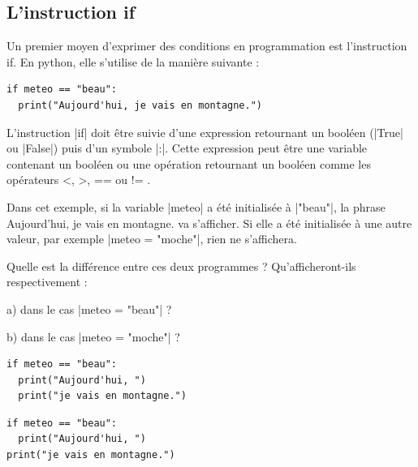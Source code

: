 \documentclass[11pt, a4paper]{book}
\begin{document}
\subsection{L'instruction \textsf{if}}
Un premier moyen d'exprimer des conditions en programmation est l'instruction \textsf{if}. En python, elle s'utilise de la manière suivante : 

\begin{lstlisting}
if meteo == "beau":
  print("Aujourd'hui, je vais en montagne.")
\end{lstlisting}

\begin{defi}
L'instruction |if| doit être suivie d'une expression retournant un booléen (|True| ou |False|) puis d'un symbole |:|.  Cette expression peut être une variable contenant un booléen ou une opération retournant un booléen comme les opérateurs <, >, == ou != .
\end{defi}

Dans cet exemple, si la variable |meteo| a été initialisée à |"beau"|, la phrase \textsf{Aujourd'hui, je vais en montagne.} va s'afficher. Si elle a été initialisée à une autre valeur, par exemple |meteo = "moche"|, rien ne s'affichera.


\begin{exercice}
Quelle est la différence entre ces deux programmes ? Qu'afficheront-ils respectivement :
\item[a)] dans le cas |meteo = "beau"| ?
\item[b)] dans le cas |meteo = "moche"| ?

\begin{lstlisting}
if meteo == "beau":
  print("Aujourd'hui, ")
  print("je vais en montagne.")
\end{lstlisting}


\begin{lstlisting}
if meteo == "beau":
  print("Aujourd'hui, ")
print("je vais en montagne.")
\end{lstlisting}

\end{exercice}
\end{document}
